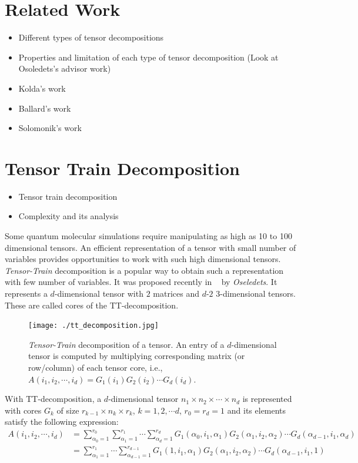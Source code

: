 \documentclass[runningheads]{llncs}
\newcommand{\ttrain}{{\it Tensor-Train}\xspace}
\begin{document}
\section{Related Work}
\label{sec:relatedWork}
\begin{itemize}
	\item Different types of tensor decompositions
	\item Properties  and limitation of each type of tensor decomposition (Look at Osoledets's advisor work)
	\item Kolda's work
	\item Ballard's work
	\item Solomonik's work
\end{itemize}


\section{Tensor Train Decomposition}
\label{sec:tt}
\begin{itemize}
	\item Tensor train decomposition
	\item Complexity and its analysis
\end{itemize}

\noindent Some quantum molecular simulations require manipulating as high as 10 to 100 dimensional tensors. An efficient representation of a tensor with small number of variables provides opportunities to work with such high dimensional tensors. \ttrain decomposition is a popular way to obtain such a representation with few number of variables. It was proposed recently in ~\cite{tt} by \textit{Oseledets}. It represents a $d$-dimensional tensor with $2$ matrices and $d$-$2$ $3$-dimensional tensors. These are called cores of the TT-decomposition.

\begin{figure}
	\begin{center}

	\texttt{[image: ./tt\_decomposition.jpg]}
	\caption{\ttrain decomposition of a tensor. An entry of a $d$-dimensional tensor is computed by multiplying corresponding matrix (or row/column) of each tensor core, i.e., $A(i_1, i_2,\cdots, i_d) = G_1(i_1)G_2(i_2)\cdots G_d(i_d)$.\label{fig:ttdiagram}}
	\end{center}
\end{figure}

\noindent With TT-decomposition, a $d$-dimensional tensor $n_1 \times n_2 \times \cdots \times n_d$ is represented with cores $G_k$ of size $r_{k-1}\times n_k\times r_k$, $k=1,2,\cdots d$, $r_0=r_d=1$ and its elements satisfy the following expression:
\begin{align*}
A(i_1, i_2,\cdots ,i_d) &= \sum_{\alpha_0 = 1}^{r_0} \sum_{\alpha_1 = 1}^{r_1} \cdots \sum_{\alpha_d = 1}^{r_d} G_1(\alpha_0, i_1, \alpha_1) G_2(\alpha_1, i_2, \alpha_2)\cdots G_d(\alpha_{d-1}, i_1, \alpha_d)\\
&= \sum_{\alpha_1 = 1}^{r_1} \cdots \sum_{\alpha_{d-1} = 1}^{r_{d-1}} G_1(1, i_1, \alpha_1) G_2(\alpha_1, i_2, \alpha_2)\cdots G_d(\alpha_{d-1}, i_1, 1)
\end{align*}
\end{document}
